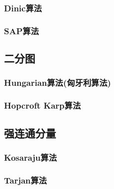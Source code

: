 \subsubsection{Dinic算法}
\subsubsection{SAP算法}

\subsection{二分图}
\subsubsection{Hungarian算法(匈牙利算法)}
\subsubsection{Hopcroft Karp算法}

\subsection{强连通分量}
\subsubsection{Kosaraju算法}
\subsubsection{Tarjan算法}
